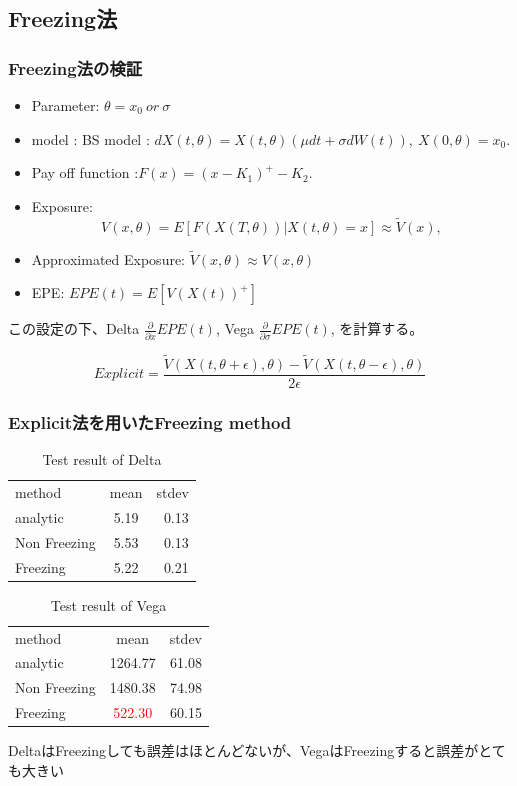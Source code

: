 \documentclass[driverfallback=dvipdfmx,cjk]{beamer}
\begin{document}
\subsection{Freezing法}
\begin{frame}\frametitle{Freezing法の検証 }
    \begin{itemize}
        \item Parameter: $\theta = x_0 \  or  \ \sigma$
        \item model : BS model :  $d X(t,\theta) = X(t,\theta) ( \mu dt + \sigma dW(t)), \ X(0,\theta) = x_0.$
        \item Pay off function :$ F(x) = (x - K_1)^+  - K_2. $
        \item Exposure: $$ V(x, \theta) = E[F(X(T, \theta)) |X(t, \theta) = x] \approx \tilde{V}(x), $$
        \item Approximated Exposure:  $\tilde{V}(x, \theta)\approx V(x, \theta)$
        \item EPE: $EPE(t) = E[V(X(t))^+] $
    \end{itemize}
    この設定の下、Delta $\frac{\partial}{\partial x} EPE(t)$, 
 Vega 
    $\frac{\partial}{\partial \sigma} EPE(t)$, 
を計算する。

\end{frame}

\begin{frame}

    $$Explicit =  \frac{\tilde{V}(X(t,\theta+\epsilon),  \theta) - \tilde{V}(X(t,\theta-\epsilon), \theta)}{2 \epsilon} $$
\end{frame}


\begin{frame}\frametitle{Explicit法を用いたFreezing method}
    \begin{table}[htb]
        \caption{Test result of Delta}
        \centering
        \begin{tabular}{lcr}
            \hline
            method & mean & stdev \\
            analytic & 5.19 & 0.13 \\
            Non Freezing & 5.53 & 0.13\\
            Freezing & 5.22 & 0.21
        \end{tabular}
    \end{table}
    \begin{table}[htb]
        \caption{Test result of Vega}
        \centering
        \begin{tabular}{lcr}
            \hline
            method & mean & stdev \\
            analytic & 1264.77 & 61.08\\
            Non Freezing & 1480.38 & 74.98\\
            Freezing & \textcolor{red}{522.30} & 60.15
        \end{tabular}
    \end{table}
        DeltaはFreezingしても誤差はほとんどないが、VegaはFreezingすると誤差がとても大きい
\end{frame}
\end{document}
